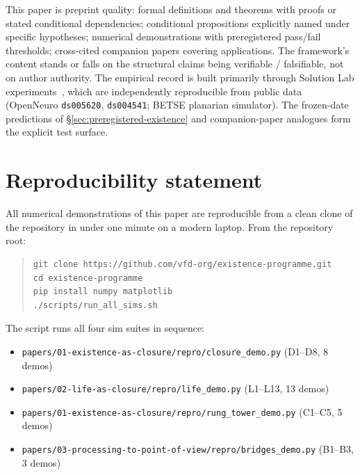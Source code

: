 \documentclass[11pt]{article}
\theoremstyle{plain}
\theoremstyle{definition}
\theoremstyle{remark}
\begin{document}
This paper is preprint quality: formal definitions and theorems with proofs or stated conditional dependencies; conditional propositions explicitly named under specific hypotheses; numerical demonstrations with preregistered pass/fail thresholds; cross-cited companion papers covering applications. The framework's content stands or falls on the structural claims being verifiable / falsifiable, not on author authority. The empirical record is built primarily through Solution Lab experiments~\citep{SolutionLab001, SolutionLab002}, which are independently reproducible from public data (OpenNeuro \texttt{ds005620}, \texttt{ds004541}; BETSE planarian simulator). The frozen-date predictions of \S\ref{sec:preregistered-existence} and companion-paper analogues form the explicit test surface.

\section{Reproducibility statement}\label{sec:reproducibility}

All numerical demonstrations of this paper are reproducible from a clean clone of the repository in under one minute on a modern laptop. From the repository root:

\begin{quote}\small
\begin{verbatim}
git clone https://github.com/vfd-org/existence-programme.git
cd existence-programme
pip install numpy matplotlib
./scripts/run_all_sims.sh
\end{verbatim}
\end{quote}

The script runs all four sim suites in sequence:

\begin{itemize}[leftmargin=2em]
\item \texttt{papers/01-existence-as-closure/repro/closure\_demo.py} (D1--D8, 8 demos)
\item \texttt{papers/02-life-as-closure/repro/life\_demo.py} (L1--L13, 13 demos)
\item \texttt{papers/01-existence-as-closure/repro/rung\_tower\_demo.py} (C1--C5, 5 demos)
\item \texttt{papers/03-processing-to-point-of-view/repro/bridges\_demo.py} (B1--B3, 3 demos)
\end{itemize}
\end{document}
